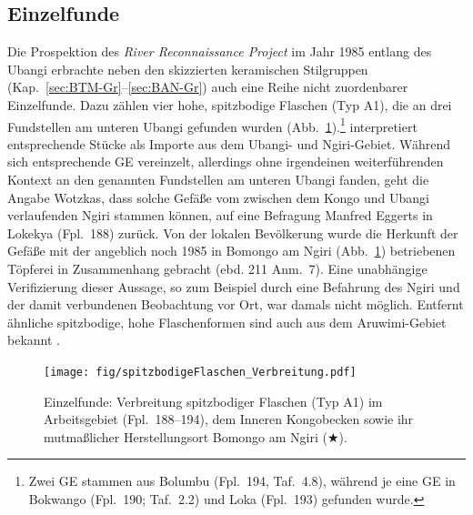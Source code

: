 \subsection{Einzelfunde}\label{sec:SHG-LKW_Einzelfunde}

Die Prospektion des \textit{River Reconnaissance Project} im Jahr 1985 entlang des \mbox{Ubangi} erbrachte neben den skizzierten keramischen Stilgruppen (Kap.~\ref{sec:BTM-Gr}--\ref{sec:BAN-Gr}) auch eine Reihe nicht zuordenbarer Einzelfunde. Dazu zählen vier hohe, spitzbodige Flaschen (Typ A1), die an drei Fundstellen am unteren \mbox{Ubangi} gefunden wurden (Abb.~\ref{fig:spitzbodigeFlaschen_Verbreitung}).\footnote{Zwei GE stammen aus Bolumbu (Fpl.~194, Taf.~4.8), während je eine GE in Bokwango (Fpl.~190; Taf.~2.2) und Loka (Fpl.~193) gefunden wurde.} \textcite[211--212]{Wotzka.1995} interpretiert entsprechende Stücke als Importe aus dem \mbox{Ubangi}- und Ngiri-Gebiet. Während sich entsprechende GE vereinzelt, allerdings ohne irgendeinen weiterführenden Kontext an den genannten Fundstellen am unteren \mbox{Ubangi} fanden, geht die Angabe Wotzkas, dass solche Gefäße vom zwischen dem Kongo und \mbox{Ubangi} verlaufenden Ngiri stammen können, auf eine Befragung Manfred Eggerts in Lokekya (Fpl.~188) zurück. Von der lokalen Bevölkerung wurde die Herkunft der Gefäße mit der angeblich noch 1985 in Bomongo am Ngiri (Abb.~\ref{fig:spitzbodigeFlaschen_Verbreitung}) betriebenen Töpferei in Zusammenhang gebracht (ebd. 211 Anm.~7). Eine unabhängige Verifizierung dieser Aussage, so zum Beispiel durch eine Befahrung des Ngiri und der damit verbundenen Beobachtung vor Ort, war damals nicht möglich. Entfernt ähnliche spitzbodige, hohe Flaschenformen sind auch aus dem Aruwimi-Gebiet bekannt \parencite[Taf.~XVII]{Coart.1907}.

\begin{figure}[p]
	\centering
	\texttt{[image: fig/spitzbodigeFlaschen\_Verbreitung.pdf]}
	\caption{Einzelfunde: Verbreitung spitzbodiger Flaschen (Typ A1) im Arbeitsgebiet (Fpl.~188--194), dem Inneren Kongobecken \parencite[211f.; Fpl.~139--145]{Wotzka.1995} sowie ihr mutmaßlicher Herstellungsort Bomongo am Ngiri ({\footnotesize $\bigstar$}).}
	\label{fig:spitzbodigeFlaschen_Verbreitung}
\end{figure}


